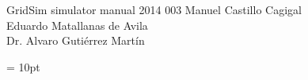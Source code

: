 \documentclass[twoside,a4paper,11pt]{book}
\begin{document}


\frontpage
	{GridSim simulator manual}
	{2014}
	{003}
	{Manuel Castillo Cagigal\\Eduardo Matallanas de Avila\\Dr. Alvaro Guti\'errez Mart\'in}

\tableofcontents
\newpage 

\baselineskip=15pt
\parskip = 10pt
\marginsize{3cm}{3cm}{2cm}{2cm}










\end{document}
